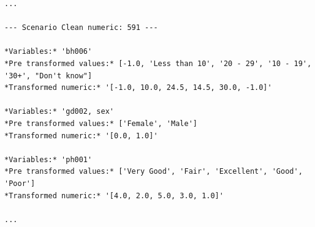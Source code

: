 \begin{mdframed}
\begin{Verbatim}[breaklines=true, breakanywhere=true]
...

--- Scenario Clean numeric: 591 ---

*Variables:* 'bh006'  
*Pre transformed values:* [-1.0, 'Less than 10', '20 - 29', '10 - 19', '30+', "Don't know"]  
*Transformed numeric:* '[-1.0, 10.0, 24.5, 14.5, 30.0, -1.0]'

*Variables:* 'gd002, sex'  
*Pre transformed values:* ['Female', 'Male']  
*Transformed numeric:* '[0.0, 1.0]'

*Variables:* 'ph001'  
*Pre transformed values:* ['Very Good', 'Fair', 'Excellent', 'Good', 'Poor']  
*Transformed numeric:* '[4.0, 2.0, 5.0, 3.0, 1.0]'

...
\end{Verbatim}

\end{mdframed}